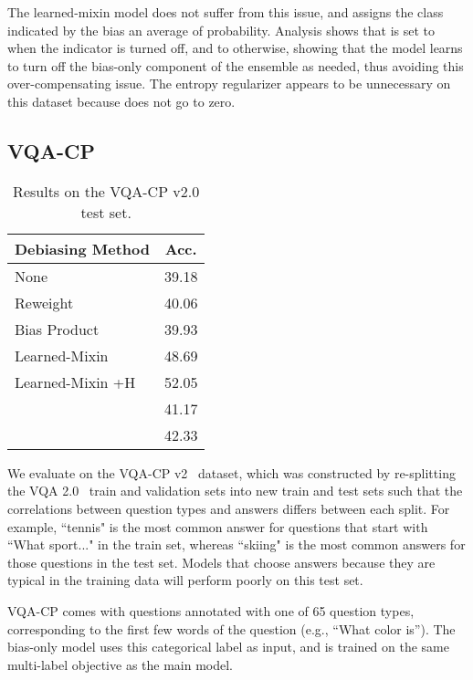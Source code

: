\documentclass[11pt,a4paper]{article}
\begin{document}
The learned-mixin model does not suffer from this issue, and assigns the class indicated by the bias an average of  probability. Analysis shows that  is set to  when the indicator is turned off, and to  otherwise, showing that the model learns to turn off the bias-only component of the ensemble as needed, thus avoiding this over-compensating issue. The entropy regularizer appears to be unnecessary on this dataset because  does not go to zero.

\subsection{VQA-CP}
\label{sect:vqap_cp}

\begin{table}
\centering
\tablefont
\begin{tabular}{lc} \toprule
Debiasing Method & Acc. \\ \midrule
None & 39.18\\
Reweight & 40.06\\
Bias Product & 39.93\\
Learned-Mixin & 48.69\\
Learned-Mixin +H & 52.05\\ \hdashline
\citet{ramakrishnan2018overcoming} & 41.17\\
\citet{grand2019adversarial} & 42.33\\
\bottomrule
\end{tabular}
\caption{Results on the VQA-CP v2.0 test set.}
\label{tab:vqa_results}
\end{table}

 We evaluate on the VQA-CP v2~\cite{vqa_cp} dataset, which was constructed by re-splitting the VQA 2.0~\cite{vqa2} train and validation sets into new train and test sets such that the correlations between question types and answers differs between each split. For example, ``tennis" is the most common answer for questions that start with ``What sport..." in the train set, whereas ``skiing" is the most common answers for those questions in the test set. Models that choose answers because they are typical in the training data will perform poorly on this test set.

 VQA-CP comes with questions annotated with one of 65 question types, corresponding to the first few words of the question (e.g., ``What color is''). The bias-only model uses this categorical label as input, and is trained on the same multi-label objective as the main model.
\end{document}
